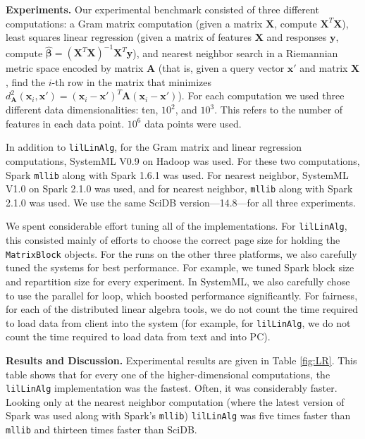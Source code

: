 \vspace{5pt}
\noindent
\textbf {Experiments.} Our experimental benchmark consisted of three different computations:
a Gram matrix computation (given a matrix $\textbf{X}$, compute
$\textbf{X}^T \textbf{X}$), least squares linear regression (given a matrix of features $\textbf{X}$ and
responses $\textbf{y}$, compute 
$\hat{\pmb{\beta}} = (\textbf{X}^{T} \textbf{X})^{-1} \textbf{X}^{T} \textbf{y}$), and nearest
neighbor search in a Riemannian metric space \cite{lebanon2006metric} encoded by matrix $\textbf{A}$ (that is,
given a query vector
$\textbf{x}'$ and matrix $\textbf{X}$, find the $i$-th row in the matrix that minimizes 
$d_{\textbf{A}}^2(\textbf{x}_i, \textbf{x}') = 
(\textbf{x}_i - \textbf{x}')^T\textbf{A}(\textbf{x}_i - \textbf{x}')$).  
For each computation we used three different data dimensionalities: ten, $10^2$, and $10^3$.  This refers to
the number of features in each data point. 
$10^6$ data points were used. 

In addition to \texttt{lilLinAlg}, 
for the Gram matrix and linear regression computations, SystemML V0.9 on Hadoop was used.
For these two computations, Spark \texttt{mllib} along with
Spark 1.6.1 was used.  For
nearest neighbor, SystemML V1.0 on Spark 2.1.0 was used, and for
nearest neighbor, \texttt{mllib} along with Spark 2.1.0 was used. We
use the same SciDB version---14.8---for all three
experiments.

We spent considerable effort tuning all of the implementations.
For \texttt{lilLinAlg}, this consisted mainly of efforts to choose the correct page size for holding the
\texttt{MatrixBlock} objects.  
For the runs on the other three platforms, we also carefully tuned the
systems for best performance. For example, we tuned Spark block size and repartition
size for every experiment. In SystemML, we also carefully chose to
use the parallel for loop, which boosted performance significantly.
For fairness, for each of the distributed linear algebra tools, 
we do not count the time required to load data from client into the system
(for example, 
for \texttt{lilLinAlg}, we do not count the time required to load data from text and into PC).

\vspace{5pt}
\noindent
\textbf{Results and Discussion.} Experimental results are given in 
Table \ref{fig:LR}. 
This table shows that for every one of the higher-dimensional computations, the 
\texttt{lilLinAlg} implementation was the fastest.  Often, it was considerably faster.
Looking only at the nearest neighbor computation (where the latest version of Spark was used
along with Spark's \texttt{mllib}) \texttt{lilLinAlg} was five times faster than \texttt{mllib}
and thirteen times faster than SciDB.  

